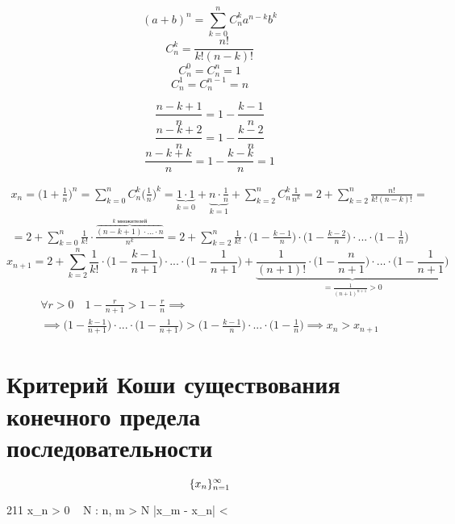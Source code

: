 \begin{note}
	$$ (a + b)^n = \sum_{k = 0}^n C_n^k a^{n-k} b^k $$
	$$ C_n^k = \frac{n!}{k!(n-k)!} $$
	$$ C_n^0 = C_n^n = 1 $$
	$$ C_n^1 = C_n^{n-1} = n $$
\end{note}

\begin{note}
	$$ \frac{n - k + 1}n = 1 - \frac{k - 1}n $$
	$$ \frac{n - k + 2}n = 1 - \frac{k - 2}n $$
	$$ \frac{n - k + k}n = 1 - \frac{k - k}n = 1 $$
\end{note}



\begin{replacementproof}[Возрастание $x_n$]
	\begin{multline*}
		x_n = \bigg( 1 + \frac1n \bigg)^n = \sum_{k=0}^n C_n^k \bigg( \frac1n \bigg)^k = \underbrace{1 \cdot 1}_{k = 0} + \underbrace{n \cdot \frac1n}_{k = 1} + \sum_{k = 2}^n C_n^k \frac1{n^k} = 2 + \sum_{k=2}^n \frac{n!}{k!(n-k)!} = \\ = 2 + \sum_{k=0}^n \frac1{k!} \cdot \frac{\overbrace{(n - k + 1) \cdot ... \cdot n}^{k \text{ множителей}}}{n^k} = 2 + \sum_{k=2}^n \frac1{k!} \cdot \bigg( 1 - \frac{k-1}n \bigg) \cdot \bigg( 1 - \frac{k - 2}n \bigg) \cdot ... \cdot \bigg( 1 - \frac1n \bigg)
	\end{multline*}
	$$ x_{n+1} = 2 + \sum_{k = 2}^n \frac1{k!} \cdot \bigg( 1 - \frac{k - 1}{n+1} \bigg) \cdot ... \cdot \bigg( 1 - \frac1{n + 1} \bigg) + \underbrace{\frac1{(n + 1)!} \cdot \bigg( 1 - \frac{n}{n + 1} \bigg) \cdot ... \cdot \bigg( 1 - \frac1{n+1} \bigg)}_{= \frac1{(n+1)^{n+1}} > 0} $$
	\begin{multline*}
		\forall r > 0 \quad 1 - \frac{r}{n + 1} > 1 - \frac{r}n \implies \\ \implies \bigg( 1 - \frac{k - 1}{n + 1} \bigg) \cdot ... \cdot \bigg( 1 - \frac1{n + 1} \bigg) > \bigg( 1 - \frac{k - 1}n \bigg) \cdot ... \cdot \bigg( 1 - \frac1n \bigg) \implies x_n > x_{n+1}
	\end{multline*}
\end{replacementproof}

\section{Критерий Коши существования конечного предела последовательности}

\begin{theorem}
	$$ \{x_n\}_{n=1}^{\infty} $$
	\begin{equ}{211}
		\exist {} x_n \in \R \iff \forall \veps > 0 ~ \exist N : \forall n, m > N \quad |x_m - x_n| < \veps
	\end{equ}
\end{theorem}

